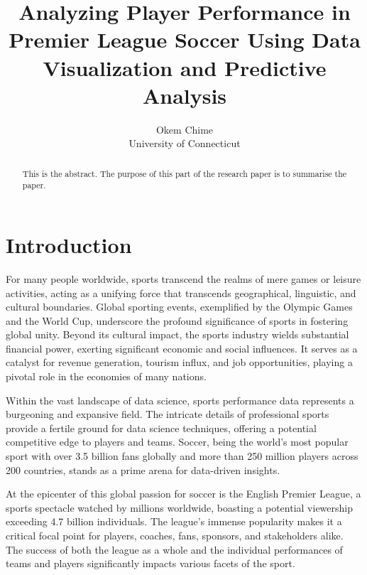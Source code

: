 \documentclass[12pt]{article}
\title{Analyzing Player Performance in Premier League Soccer Using 
Data Visualization and Predictive Analysis}
\author{Okem Chime\\
  University of Connecticut
}
\begin{document}
\maketitle

\begin{abstract}
This is the abstract. The purpose of this part of the research paper is to
summarise the paper.

\end{abstract}


\section{Introduction}
\label{sec:intro}




For many people worldwide, sports transcend the realms of mere games or leisure
activities, acting as a unifying force that transcends geographical, linguistic,
and cultural boundaries. Global sporting events, exemplified by the Olympic Games
and the World Cup, underscore the profound significance of sports in fostering
global unity. Beyond its cultural impact, the sports industry wields substantial
financial power, exerting significant economic and social influences. It serves
as a catalyst for revenue generation, tourism influx, and job opportunities,
playing a pivotal role in the economies of many nations.

Within the vast landscape of data science, sports performance data represents a
burgeoning and expansive field. The intricate details of professional sports
provide a fertile ground for data science techniques, offering a potential
competitive edge to players and teams. Soccer, being the world's most popular
sport with over 3.5 billion fans globally and more than 250 million players
across 200 countries, stands as a prime arena for data-driven insights.

At the epicenter of this global passion for soccer is the English Premier League,
a sports spectacle watched by millions worldwide, boasting a potential viewership
exceeding 4.7 billion individuals. The league's immense popularity makes it a
critical focal point for players, coaches, fans, sponsors, and stakeholders alike.
The success of both the league as a whole and the individual performances of teams
and players significantly impacts various facets of the sport.
\end{document}
